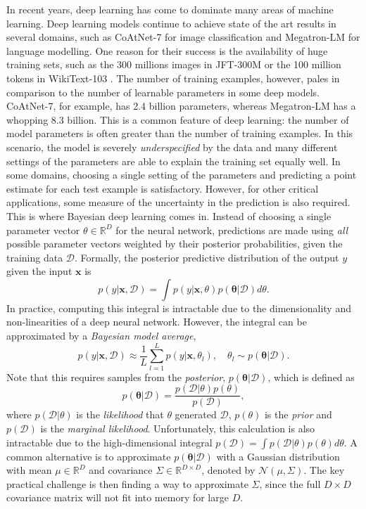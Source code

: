 \documentclass[msc,deptreport.inf]{infthesis} %
\newcommand{\matr}[1]{\mathbf{#1}}
\newcommand{\bgreek}[1]{\boldsymbol{#1}}
\newcommand{\R}{\mathbb R}
\begin{document}
In recent years, deep learning \cite{goodfellow2016} has come to dominate many areas of machine learning. Deep learning models continue to achieve state of the art results in several domains, such as CoAtNet-7 \cite{dai2021} for image classification and Megatron-LM \cite{shoeybi2019} for language modelling. One reason for their success is the availability of huge training sets, such as the 300 millions images in JFT-300M \cite{sun2017} or the 100 million tokens in WikiText-103 \cite{merity2016}. The number of training examples, however, pales in comparison to the number of learnable parameters in some deep models. CoAtNet-7, for example, has 2.4 billion parameters, whereas Megatron-LM has a whopping 8.3 billion. This is a common feature of deep learning: the number of model parameters is often greater than the number of training examples. In this scenario, the model is severely \emph{underspecified} by the data and many different settings of the parameters are able to explain the training set equally well. In some domains, choosing a single setting of the parameters and predicting a point estimate for each test example is satisfactory. However, for other critical applications, some measure of the uncertainty in the prediction is also required. This is where Bayesian deep learning comes in. Instead of choosing a single parameter vector $\theta \in \R^D$ for the neural network, predictions are made using \emph{all} possible parameter vectors weighted by their posterior probabilities, given the training data $\mathcal{D}$. Formally, the posterior predictive distribution of the output $y$ given the input $\matr{x}$ is
\begin{equation}
	p(y | \matr{x}, \mathcal{D}) = \int p(y | \matr{x}, \theta) p(\bgreek{\theta} | \mathcal{D}) d\theta.
\end{equation}
In practice, computing this integral is intractable due to the dimensionality and non-linearities of a deep neural network. However, the integral can be approximated by a \emph{Bayesian model average},
\begin{equation}
	p(y | \matr{x}, \mathcal{D}) \approx \frac{1}{L} \sum_{l=1}^L p(y | \matr{x}, \theta_l), 
	\quad \theta_l \sim p(\bgreek{\theta} | \mathcal{D}).
\end{equation}
Note that this requires samples from the \emph{posterior}, $p(\bgreek{\theta} | \mathcal{D})$, which is defined as
\begin{equation}
	p(\bgreek{\theta} | \mathcal{D}) = \frac{p(\mathcal{D} | \theta) p(\theta)}{p(\mathcal{D})},
\end{equation}
where $p(\mathcal{D} | \theta)$ is the \emph{likelihood} that $\theta$ generated $\mathcal{D}$, $p(\theta)$ is the \emph{prior} and $p(\mathcal{D})$ is the \emph{marginal likelihood}. Unfortunately, this calculation is also intractable due to the high-dimensional integral $p(\mathcal{D}) = \int p(\mathcal{D} | \theta) p(\theta) d\theta$. A common alternative is to approximate $p(\bgreek{\theta} | \mathcal{D})$ with a Gaussian distribution with mean $\mu \in \R^D$ and covariance $\Sigma \in \R^{D\times D}$, denoted by $\mathcal{N}(\mu, \Sigma)$. The key practical challenge is then finding a way to approximate $\Sigma$, since the full $D\times D$ covariance matrix will not fit into memory for large $D$. 
\end{document}
